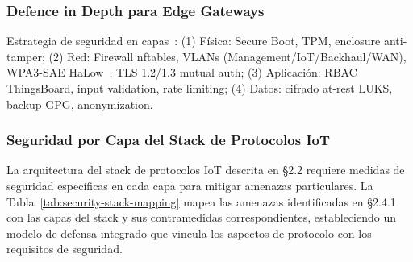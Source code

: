 \subsubsection{Defence in Depth para Edge Gateways}

Estrategia de seguridad en capas~\cite{m.mijwilPostQuantumSecureBlockchainBased2025,ramakrishnaAnalysisLightweightCryptographic2024,iec62443-4-2}: (1) Física: Secure Boot, TPM, enclosure anti-tamper; (2) Red: Firewall nftables, VLANs (Management/IoT/Backhaul/WAN), WPA3-SAE HaLow~\cite{IEEE80211ah2016}, TLS 1.2/1.3 mutual auth; (3) Aplicación: RBAC ThingsBoard, input validation, rate limiting; (4) Datos: cifrado at-rest LUKS, backup GPG, anonymization.

\subsubsection{Seguridad por Capa del Stack de Protocolos IoT}

La arquitectura del stack de protocolos IoT descrita en §2.2 requiere medidas de seguridad específicas en cada capa para mitigar amenazas particulares. La Tabla~\ref{tab:security-stack-mapping} mapea las amenazas identificadas en §2.4.1 con las capas del stack y sus contramedidas correspondientes, estableciendo un modelo de defensa integrado que vincula los aspectos de protocolo con los requisitos de seguridad.

